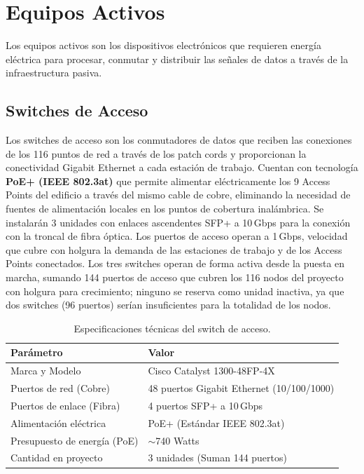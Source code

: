 \section{Equipos Activos}
Los equipos activos son los dispositivos electrónicos que requieren energía eléctrica para procesar, conmutar y distribuir las señales de datos a través de la infraestructura pasiva.

\subsection{Switches de Acceso}
Los switches de acceso son los conmutadores de datos que reciben las conexiones de los 116 puntos de red a través de los patch cords y proporcionan la conectividad Gigabit Ethernet a cada estación de trabajo. Cuentan con tecnología \textbf{PoE+ (IEEE 802.3at)} que permite alimentar eléctricamente los 9 Access Points del edificio a través del mismo cable de cobre, eliminando la necesidad de fuentes de alimentación locales en los puntos de cobertura inalámbrica. Se instalarán 3 unidades con enlaces ascendentes SFP+ a 10\,Gbps para la conexión con la troncal de fibra óptica. Los puertos de acceso operan a 1\,Gbps, velocidad que cubre con holgura la demanda de las estaciones de trabajo y de los Access Points conectados.
Los tres switches operan de forma activa desde la puesta en marcha, sumando 144 puertos de acceso que cubren los 116 nodos del proyecto con holgura para crecimiento; ninguno se reserva como unidad inactiva, ya que dos switches (96 puertos) serían insuficientes para la totalidad de los nodos.

\begin{table}[H]
\centering
\caption{Especificaciones técnicas del switch de acceso.}
\label{tab:spec_switch}
\begin{tabular}{lp{9cm}}
\hline
\textbf{Parámetro} & \textbf{Valor} \\
\hline
Marca y Modelo & Cisco Catalyst 1300-48FP-4X \\
Puertos de red (Cobre) & 48 puertos Gigabit Ethernet (10/100/1000) \\
Puertos de enlace (Fibra) & 4 puertos SFP+ a 10\,Gbps \\
Alimentación eléctrica & PoE+ (Estándar IEEE 802.3at) \\
Presupuesto de energía (PoE) & $\sim$740 Watts \\
Cantidad en proyecto & 3 unidades (Suman 144 puertos) \\
\hline
\end{tabular}
\end{table}

